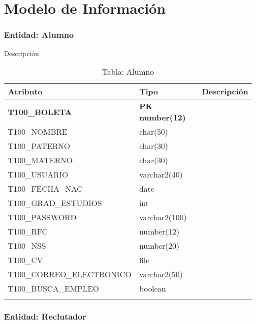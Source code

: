 \chapter{Modelo de Información}
\label{ch:modInfo}

\subsection{Entidad: Alumno}

Descripción
\begin{longtable}{| p{} | p{} | p{} |}
    \hline
        Atributo & Tipo & Descripción\\
    \hline
    \endhead
    \hline
    \bf{T100\_BOLETA}& \bf PK number(12)& \\
    \hline
    T100\_NOMBRE& char(50)& \\
    \hline
    T100\_PATERNO& char(30)& \\
    \hline
    T100\_MATERNO& char(30)& \\
    \hline
    T100\_USUARIO& varchar2(40)& \\
    \hline
    T100\_FECHA\_NAC& date& \\
    \hline
    T100\_GRAD\_ESTUDIOS& int& \\
    \hline
    T100\_PASSWORD& varchar2(100)& \\
    \hline
    T100\_RFC& number(12)& \\
    \hline
    T100\_NSS& number(20)& \\
    \hline
    T100\_CV& file& \\
    \hline
    T100\_CORREO\_ELECTRONICO& varchar2(50)& \\ 
    \hline
    T100\_BUSCA\_EMPLEO& boolean& \\
    \hline
    \caption{Tabla: Alumno}
\end{longtable}

\subsection{Entidad: Reclutador}

